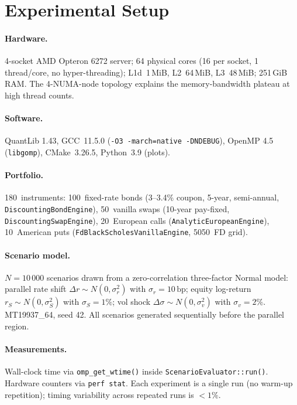 \documentclass[11pt,twocolumn]{article}
\begin{document}
\section{Experimental Setup}

\paragraph{Hardware.}
4-socket AMD Opteron 6272 server; 64 physical cores
(16 per socket, 1 thread/core, no hyper-threading);
L1d~1\,MiB, L2~64\,MiB, L3~48\,MiB; 251\,GiB RAM.
The 4-NUMA-node topology explains the memory-bandwidth plateau
at high thread counts.

\paragraph{Software.}
QuantLib 1.43, GCC~11.5.0 (\texttt{-O3 -march=native -DNDEBUG}),
OpenMP 4.5 (\texttt{libgomp}), CMake~3.26.5, Python~3.9 (plots).

\paragraph{Portfolio.}
180~instruments: 100~fixed-rate bonds (3--3.4\% coupon, 5-year,
semi-annual, \texttt{DiscountingBondEngine}), 50~vanilla swaps
(10-year pay-fixed, \texttt{DiscountingSwapEngine}), 20~European
calls (\texttt{AnalyticEuropeanEngine}), 10~American puts
(\texttt{FdBlackScholesVanillaEngine}, 50{\texttimes}50~FD grid).

\paragraph{Scenario model.}
$N = 10\,000$ scenarios drawn from a zero-correlation three-factor
Normal model: parallel rate shift $\Delta r \sim N(0,\sigma_r^2)$
with $\sigma_r = 10\,\text{bp}$; equity log-return
$r_S \sim N(0,\sigma_S^2)$ with $\sigma_S = 1\%$; vol shock
$\Delta\sigma \sim N(0,\sigma_v^2)$ with $\sigma_v = 2\%$.
MT19937\_64, seed 42.  All scenarios generated sequentially before
the parallel region.

\paragraph{Measurements.}
Wall-clock time via \texttt{omp\_get\_wtime()} inside
\texttt{ScenarioEvaluator::run()}.  Hardware counters via
\texttt{perf stat}.  Each experiment is a single run (no warm-up
repetition); timing variability across repeated runs is $<1\%$.
\end{document}
